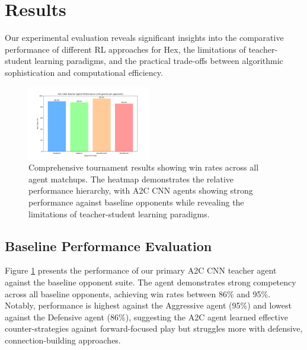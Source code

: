 \documentclass[conference]{IEEEtran}
\begin{document}
\section{Results}

Our experimental evaluation reveals significant insights into the comparative performance of different RL approaches for Hex, the limitations of teacher-student learning paradigms, and the practical trade-offs between algorithmic sophistication and computational efficiency.

\begin{figure}[htbp]
\centering
\includegraphics[width=0.48\textwidth]{tournament_results.png}
\caption{Comprehensive tournament results showing win rates across all agent matchups. The heatmap demonstrates the relative performance hierarchy, with A2C CNN agents showing strong performance against baseline opponents while revealing the limitations of teacher-student learning paradigms.}
\label{fig:tournament_overview}
\end{figure}

\subsection{Baseline Performance Evaluation}

Figure \ref{fig:tournament_overview} presents the performance of our primary A2C CNN teacher agent against the baseline opponent suite. The agent demonstrates strong competency across all baseline opponents, achieving win rates between 86\% and 95\%. Notably, performance is highest against the Aggressive agent (95\%) and lowest against the Defensive agent (86\%), suggesting the A2C agent learned effective counter-strategies against forward-focused play but struggles more with defensive, connection-building approaches.
\end{document}
